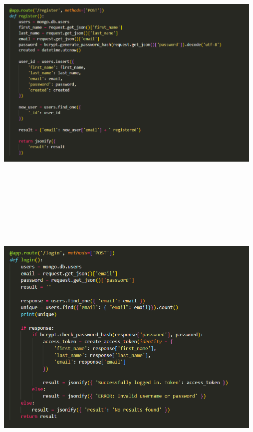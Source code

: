 \begin{center}
    \includegraphics[width=13cm,height=13cm,keepaspectratio]{images/backend2}
\end{center}

\begin{center}
    \includegraphics[width=13cm,height=13cm,keepaspectratio]{images/backend3}
\end{center}

